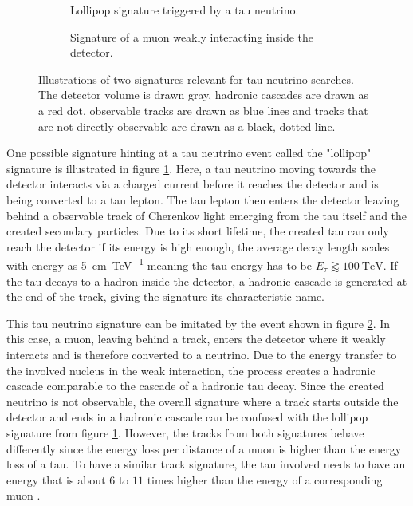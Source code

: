 \begin{figure}
    \centering
    \begin{subfigure}{0.46\textwidth}
        \centering
        
        \caption{Lollipop signature triggered by a tau neutrino.}
        \label{fig:lollipop_signature}
    \end{subfigure}%
    \hspace{0.06\textwidth}%
    \begin{subfigure}{0.46\textwidth}
        \centering
        
        \caption{Signature of a muon weakly interacting inside the detector.}
        \label{fig:weak_signature}
    \end{subfigure}
    \caption{Illustrations of two signatures relevant for tau neutrino searches. The detector volume is drawn gray, hadronic cascades are drawn as a red dot, observable tracks are drawn as blue lines and tracks that are not directly observable are drawn as a black, dotted line.}
    \label{fig:test}
\end{figure}

One possible signature hinting at a tau neutrino event called the "lollipop" signature is illustrated in figure \ref{fig:lollipop_signature}.
Here, a tau neutrino moving towards the detector interacts via a charged current before it reaches the detector and is being converted to a tau lepton.
The tau lepton then enters the detector leaving behind a observable track of Cherenkov light emerging from the tau itself and the created secondary particles.
Due to its short lifetime, the created tau can only reach the detector if its energy is high enough, the average decay length scales with energy as \SI{5}{\cm\per\tera\electronvolt} \cite{Aartsen_2016} meaning the tau energy has to be $E_{\tau} \gtrapprox \SI{100}{\tera\electronvolt}$.
If the tau decays to a hadron inside the detector, a hadronic cascade is generated at the end of the track, giving the signature its characteristic name. 

This tau neutrino signature can be imitated by the event shown in figure \ref{fig:weak_signature}.
In this case, a muon, leaving behind a track, enters the detector where it weakly interacts and is therefore converted to a neutrino.
Due to the energy transfer to the involved nucleus in the weak interaction, the process creates a hadronic cascade comparable to the cascade of a hadronic tau decay.
Since the created neutrino is not observable, the overall signature where a track starts outside the detector and ends in a hadronic cascade can be confused with the lollipop signature from figure \ref{fig:lollipop_signature}.
However, the tracks from both signatures behave differently since the energy loss per distance of a muon is higher than the energy loss of a tau.
To have a similar track signature, the tau involved needs to have an energy that is about $\num{6}$ to $\num{11}$ times higher than the energy of a corresponding muon \cite{Sandrock:2018hpj}.

